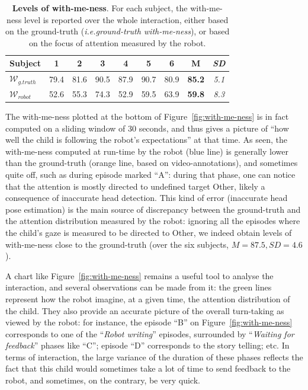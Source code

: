 \documentclass{sig-alternate}
\newcommand{\ie}{\textit{i.e.}\xspace}
\begin{document}
\begin{table}[h!]
    \centering
    \caption{\textbf{Levels of with-me-ness}. For each subject, the with-me-ness
    level is reported over the whole interaction, either based on the
    ground-truth (\ie \emph{ground-truth with-me-ness}), or based on the focus of
    attention measured by the robot.}

    \begin{tabular}{p{1cm}cccccccc}
        \toprule
        Subject & 1 & 2 & 3 & 4 & 5 & 6 & {\bf M} & {\it SD} \\
        \midrule
        $\mathcal{W}_{g.truth}$ & 79.4 & 81.6  & 90.5 & 87.9 & 90.7 & 80.9 & {\bf 85.2} & {\it 5.1} \\ 
        $\mathcal{W}_{robot}$ & 52.6 & 55.3 & 74.3 & 52.9 & 59.5 & 63.9 & {\bf 59.8} & {\it 8.3} \\
        \bottomrule
    \end{tabular}
    \label{tab:results-with-me-ness}
\end{table}

The with-me-ness plotted at the bottom of Figure~\ref{fig:with-me-ness} is in
fact computed on a sliding window of 30 seconds, and thus gives a picture of
``how well the child is following the robot's expectations'' at that time. As
seen, the with-me-ness computed at run-time by the robot (blue line) is
generally lower than the ground-truth (orange line, based on video-annotations),
and sometimes quite off, such as during episode marked ``A'': during that phase,
one can notice that the attention is mostly directed to undefined target {\sf
Other}, likely a consequence of inaccurate head detection.  This kind of error
(inaccurate head pose estimation) is the main source of discrepancy between the
ground-truth and the attention distribution measured by the robot: ignoring all
the episodes where the child's gaze is measured to be directed to {\sf Other},
we indeed obtain levels of with-me-ness close to the ground-truth (over the six
subjects, $M=87.5, SD=4.6$).

A chart like Figure~\ref{fig:with-me-ness} remains a useful tool to analyse the
interaction, and several observations can be made from it: the green lines
represent how the robot imagine, at a given time, the attention distribution of
the child. They also provide an accurate picture of the overall turn-taking as
viewed by the robot: for instance, the episode ``B'' on
Figure~\ref{fig:with-me-ness} corresponds to one of the ``\emph{Robot writing}''
episodes, surrounded by ``\emph{Waiting for feedback}'' phases like ``C'';
episode ``D'' corresponds to the story telling; etc. In terms of interaction,
the large variance of the duration of these phases reflects the fact that this
child would sometimes take a lot of time to send feedback to the robot, and
sometimes, on the contrary, be very quick.
\end{document}
